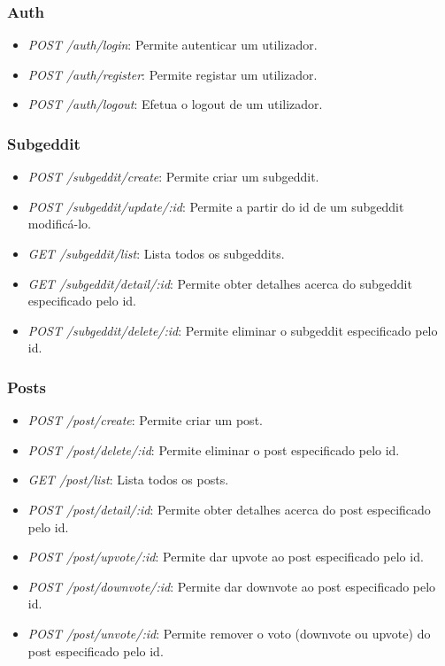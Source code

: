 \documentclass{article}
\begin{document}
	\subsubsection{Auth}
	
	\begin{itemize}
		\item \textit{POST /auth/login}: Permite autenticar um utilizador.
		\item \textit{POST /auth/register}: Permite registar um utilizador.
		\item \textit{POST /auth/logout}: Efetua o logout de um utilizador.
	\end{itemize}
	
	\subsubsection{Subgeddit}
	
	\begin{itemize}
		\item \textit{POST /subgeddit/create}: Permite criar um subgeddit.
		\item \textit{POST /subgeddit/update/:id}: Permite a partir do id de um subgeddit modificá-lo.
		\item \textit{GET /subgeddit/list}: Lista todos os subgeddits.
		\item \textit{GET /subgeddit/detail/:id}: Permite obter detalhes acerca do subgeddit especificado pelo id.
		\item \textit{POST /subgeddit/delete/:id}: Permite eliminar o subgeddit especificado pelo id.
	\end{itemize}
	
	\subsubsection{Posts}
	
	\begin{itemize}
		\item \textit{POST /post/create}: Permite criar um post.
		\item \textit{POST /post/delete/:id}: Permite eliminar o post especificado pelo id.
		\item \textit{GET /post/list}: Lista todos os posts.
		\item \textit{POST /post/detail/:id}: Permite obter detalhes acerca do post especificado pelo id.
		\item \textit{POST /post/upvote/:id}: Permite dar upvote ao post especificado pelo id.
		\item \textit{POST /post/downvote/:id}: Permite dar downvote ao post especificado pelo id.
		\item \textit{POST /post/unvote/:id}: Permite remover o voto (downvote ou upvote) do post especificado pelo id.
	\end{itemize}
	
\end{document}
